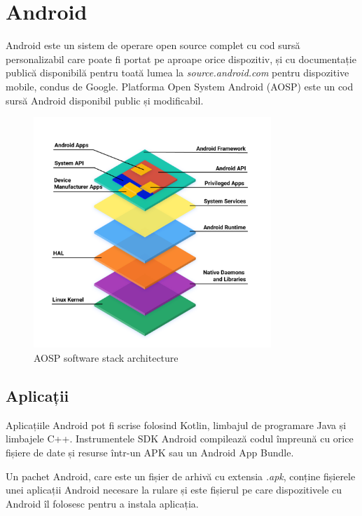 \documentclass[12pt,a4paper]{report}
\begin{document}
\section{Android}
Android este un sistem de operare open source complet cu cod sursă personalizabil
care poate fi portat pe aproape orice dispozitiv, și cu documentație publică disponibilă
pentru toată lumea la \textit{source.android.com} pentru dispozitive mobile, condus de Google\cite{android-source}.
Platforma Open System Android (AOSP) este un cod sursă Android disponibil public și modificabil.
\begin{figure}[H]
      \centering
      \includegraphics[width=0.8\textwidth]{visuals/android_stack.png}
      \caption{AOSP software stack architecture \cite{android-architecture}}
      \label{fig:android_stack}
\end{figure}
\subsection{Aplicații}
Aplicațiile Android pot fi scrise folosind Kotlin, limbajul de programare Java și limbajele C++.
Instrumentele SDK Android compilează codul împreună cu orice fișiere de date și resurse într-un APK sau un Android App Bundle.\cite{android-application-fundamentals}

Un pachet Android, care este un fișier de arhivă cu extensia \textit{.apk},
conține fișierele unei aplicații Android necesare la rulare și este fișierul pe care dispozitivele cu Android îl folosesc pentru a instala aplicația.\cite{android-application-fundamentals}
\end{document}
